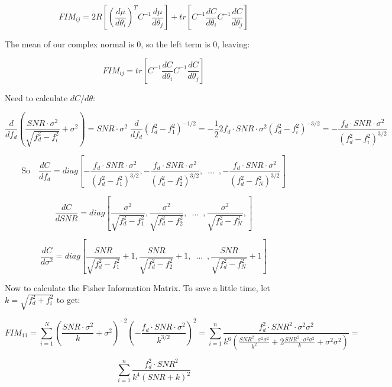 \documentclass{article}
\begin{document}
\[
FIM_{ij} = 2R \left[
{\left(\frac{d\mu}{d\theta_i}\right)^T} C^{-1} \frac{d\mu}{d\theta_j}
\right] + 
tr \left[
C^{-1} \frac{dC}{d\theta_i} C^{-1} \frac{dC}{d\theta_j}
\right]
\]

The mean of our complex normal is 0, so the left term is 0, leaving:

\[
FIM_{ij} = tr \left[
C^{-1} \frac{dC}{d\theta_i} C^{-1} \frac{dC}{d\theta_j}
\right]
\]

Need to calculate $dC/d\theta$:

\[
\frac{d}{df_d} \left( \frac{SNR \cdot \sigma^2}{\sqrt{f^2_d - f^2_i}} + \sigma^2 \right) =
SNR \cdot \sigma^2 \; \frac{d}{df_d} (f^2_d-f^2_1)^{-1/2} =
-\frac{1}{2}2f_d \cdot SNR \cdot \sigma^2(f^2_d-f^2_i)^{-3/2} =
-\frac{f_d \cdot SNR \cdot \sigma^2}{(f^2_d - f^2_i)^{3/2}}
\]

\[
\text{So} \quad \frac{dC}{df_d} = diag \left[-\frac{f_d \cdot SNR \cdot \sigma^2}{(f^2_d - f^2_1)^{3/2}},
-\frac{f_d \cdot SNR \cdot \sigma^2}{(f^2_d - f^2_2)^{3/2}}, \hspace{6pt} \ldots \hspace{6pt},
-\frac{f_d \cdot SNR \cdot \sigma^2}{(f^2_d - f^2_N)^{3/2}}
\right]
\]

\[
\frac{dC}{dSNR} = diag \left[ \frac{\sigma^2}{\sqrt{f^2_d-f^2_1}}, \frac{\sigma^2}{\sqrt{f^2_d-f^2_2}},
\hspace{6pt} \ldots \hspace{6pt}, \frac{\sigma^2}{\sqrt{f^2_d-f^2_N}},
\right]
\]

\[
\frac{dC}{d\sigma^2} = diag \left[
\frac{SNR}{\sqrt{f^2_d-f^2_1}}+1, \frac{SNR}{\sqrt{f^2_d-f^2_2}}+1,
\hspace{6pt} \ldots{} \hspace{6pt}, \frac{SNR}{\sqrt{f^2_d-f^2_N}}+1
\right]
\]

\vspace{1em}

Now to calculate the Fisher Information Matrix. To save a little time, let $k = \sqrt{f^2_d+f^2_i}$ to get:

\[
FIM_{11} = \sum^N_{i=1} \left( \frac{SNR \cdot \sigma^2}{k} + \sigma^2 \right)^{-2}
\left( -\frac{f_d \cdot SNR \cdot \sigma^2}{k^{3/2}} \right)^2 = 
\sum^n_{i=1}\frac{f^2_d \cdot SNR^2 \cdot \sigma^2\sigma^2}
{k^6 \left( \frac{SNR^2 \cdot \sigma^2\sigma^2}{k^2} + 2\frac{SNR^2 \cdot \sigma^2\sigma^2}{k} + \sigma^2\sigma^2 \right)} =
\]

\[
\sum^n_{i=1} \frac{f^2_d \cdot SNR^2}{k^4(SNR+k)^2}
\]

\vspace{2em}
\end{document}
